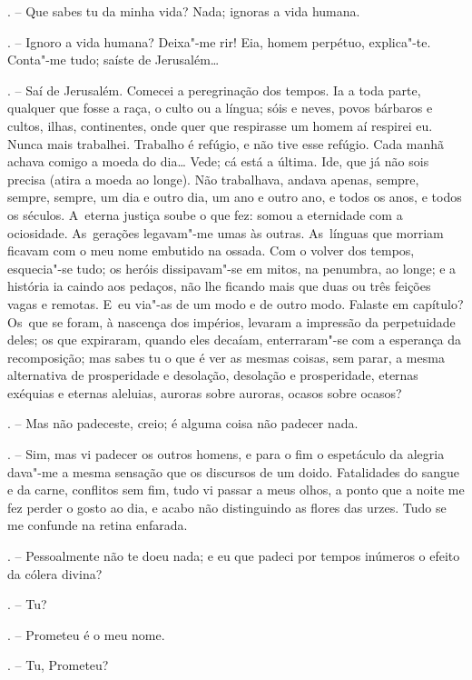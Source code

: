 \begin{Parskip}
. -- Que sabes tu da minha vida? Nada; ignoras a vida humana.

. -- Ignoro a vida humana? Deixa"-me rir! Eia, homem perpétuo,
explica"-te. Conta"-me tudo; saíste de Jerusalém\ldots{}

. -- Saí de Jerusalém. Comecei a peregrinação dos tempos. Ia a
toda parte, qualquer que fosse a raça, o culto ou a língua; sóis e
neves, povos bárbaros e cultos, ilhas, continentes, onde quer que
respirasse um homem aí respirei eu. Nunca mais trabalhei. Trabalho é
refúgio, e não tive esse refúgio. Cada manhã achava comigo a moeda do
dia\ldots{} Vede; cá está a última. Ide, que já não sois precisa (atira a
moeda ao longe). Não trabalhava, andava apenas, sempre, sempre, sempre,
um dia e outro dia, um ano e outro ano, e todos os anos, e todos os
séculos. A~eterna justiça soube o que fez: somou a eternidade com a
ociosidade. As~gerações legavam"-me umas às outras. As~línguas que
morriam ficavam com o meu nome embutido na ossada. Com o volver dos
tempos, esquecia"-se tudo; os heróis dissipavam"-se em mitos, na penumbra,
ao longe; e a história ia caindo aos pedaços, não lhe ficando mais que
duas ou três feições vagas e remotas. E~eu via"-as de um modo e de outro
modo. Falaste em capítulo? Os~que se foram, à nascença dos impérios,
levaram a impressão da perpetuidade deles; os que expiraram, quando eles
decaíam, enterraram"-se com a esperança da recomposição; mas sabes tu o
que é ver as mesmas coisas, sem parar, a mesma alternativa de
prosperidade e desolação, desolação e prosperidade, eternas exéquias e
eternas aleluias, auroras sobre auroras, ocasos sobre ocasos?

. -- Mas não padeceste, creio; é alguma coisa não padecer nada.

. -- Sim, mas vi padecer os outros homens, e para o fim o
espetáculo da alegria dava"-me a mesma sensação que os discursos de um
doido. Fatalidades do sangue e da carne, conflitos sem fim, tudo vi
passar a meus olhos, a ponto que a noite me fez perder o gosto ao dia, e
acabo não distinguindo as flores das urzes. Tudo se me confunde na
retina enfarada.

. -- Pessoalmente não te doeu nada; e eu que padeci por tempos
inúmeros o efeito da cólera divina?

. -- Tu?

. -- Prometeu é o meu nome.

. -- Tu, Prometeu?


\end{Parskip}
